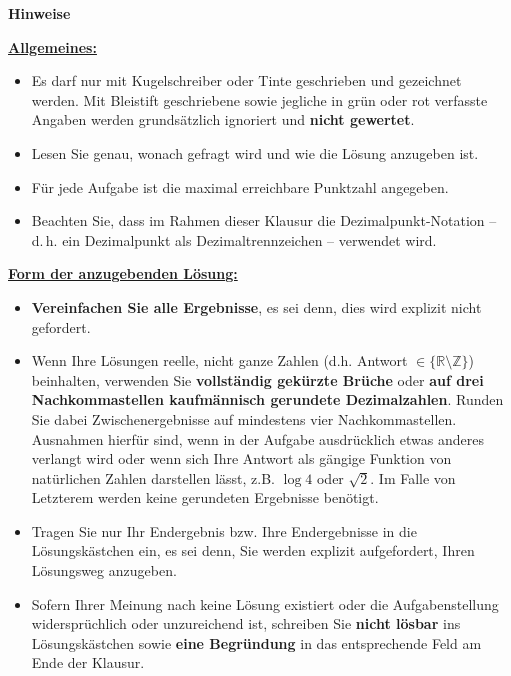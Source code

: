 \documentclass[12pt,a4paper]{article}
\newcommand{\sq}{\raisebox{1.5pt}{\tiny$\blacksquare$}}
\begin{document}
\newpage\thispagestyle{empty}
\begin{center}\large\bfseries Hinweise\end{center}
{\small\setlength{\parskip}{0pt}
\noindent\underline{\textbf{Allgemeines:}}
\begin{itemize}[label=\sq,itemsep=2pt,topsep=2pt]
\item Es darf nur mit Kugelschreiber oder Tinte geschrieben und gezeichnet werden. Mit Bleistift geschriebene sowie jegliche in grün oder rot verfasste Angaben werden grundsätzlich ignoriert und \textbf{nicht gewertet}.
\item Lesen Sie genau, wonach gefragt wird und wie die Lösung anzugeben ist.
\item Für jede Aufgabe ist die maximal erreichbare Punktzahl angegeben.
\item Beachten Sie, dass im Rahmen dieser Klausur die Dezimalpunkt-Notation -- d.\,h. ein Dezimalpunkt als Dezimaltrennzeichen -- verwendet wird.
\end{itemize}
\noindent\underline{\textbf{Form der anzugebenden Lösung:}}
\begin{itemize}[label=\sq,itemsep=2pt,topsep=2pt]
\item \textbf{Vereinfachen Sie alle Ergebnisse}, es sei denn, dies wird explizit nicht gefordert.
\item Wenn Ihre Lösungen reelle, nicht ganze Zahlen (d.h. Antwort $\in\{\mathbb{R}\setminus\mathbb{Z}\}$) beinhalten, verwenden Sie \textbf{vollständig gekürzte Brüche} oder \textbf{auf drei Nachkommastellen kaufmännisch gerundete Dezimalzahlen}. Runden Sie dabei Zwischenergebnisse auf mindestens vier Nachkommastellen. Ausnahmen hierfür sind, wenn in der Aufgabe ausdrücklich etwas anderes verlangt wird oder wenn sich Ihre Antwort als gängige Funktion von natürlichen Zahlen darstellen lässt, z.B. $\log 4$ oder $\sqrt2$. Im Falle von Letzterem werden keine gerundeten Ergebnisse benötigt.
\item Tragen Sie nur Ihr Endergebnis bzw. Ihre Endergebnisse in die Lösungskästchen ein, es sei denn, Sie werden explizit aufgefordert, Ihren Lösungsweg anzugeben.
\item Sofern Ihrer Meinung nach keine Lösung existiert oder die Aufgabenstellung widersprüchlich oder unzureichend ist, schreiben Sie \textbf{nicht lösbar} ins Lösungskästchen sowie \textbf{eine Begründung} in das entsprechende Feld am Ende der Klausur.
\end{itemize}
}
\end{document}
